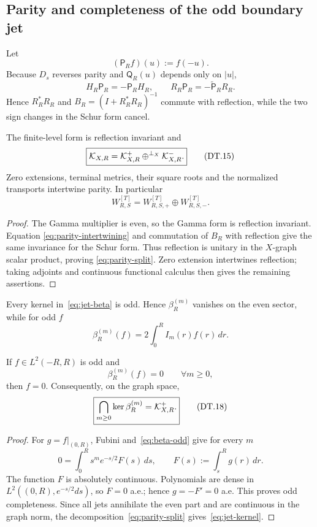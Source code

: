 \subsection{Parity and completeness of the odd boundary jet}

Let
\[
 (\mathsf P_Rf)(u):=f(-u).
\]
Because $D_s$ reverses parity and $\mathsf Q_R(u)$ depends only on $|u|$,
\[
 H_R\mathsf P_R=-\mathsf P_RH_R,
 \qquad
 R_R\mathsf P_R=-\widetilde{\mathsf P}_RR_R.
\tag{DT.14}\label{eq:parity-intertwining}
\]
Hence $R_R^*R_R$ and $B_R=(I+R_R^*R_R)^{-1}$ commute with reflection, while the two
sign changes in the Schur form cancel.

\begin{proposition}\label{prop:parity}
The finite-level form is reflection invariant and
\[
 \boxed{
 \mathcal K_{X,R}=\mathcal K_{X,R}^{+}\oplus^{\perp_X}\mathcal K_{X,R}^{-}.
 }
\tag{DT.15}\label{eq:parity-split}
\]
Zero extensions, terminal metrics, their square roots and the normalized transports
intertwine parity.  In particular
\[
 W_{R,S}^{[T]}=W_{R,S,+}^{[T]}\oplus W_{R,S,-}^{[T]}.
\tag{DT.16}\label{eq:W-parity-split}
\]
\end{proposition}

\begin{proof}
The Gamma multiplier is even, so the Gamma form is reflection invariant.  Equation
\eqref{eq:parity-intertwining} and commutation of $B_R$ with reflection give the same invariance for the
Schur form.  Thus reflection is unitary in the $X$-graph scalar product, proving
\eqref{eq:parity-split}.  Zero extension intertwines reflection; taking adjoints and continuous
functional calculus then gives the remaining assertions.
\end{proof}

Every kernel in~\eqref{eq:jet-beta} is odd.  Hence $\beta_R^{(m)}$ vanishes on the even sector,
while for odd $f$
\[
 \beta_R^{(m)}(f)=2\int_0^R I_m(r)f(r)\,dr.
\tag{DT.17}\label{eq:beta-odd}
\]

\begin{theorem}\label{thm:jet-complete}
If $f\in L^2(-R,R)$ is odd and
\[
 \beta_R^{(m)}(f)=0\qquad\forall m\ge0,
\]
then $f=0$.  Consequently, on the graph space,
\[
 \boxed{
 \bigcap_{m\ge0}\ker\beta_R^{(m)}=\mathcal K_{X,R}^{+}.
 }
\tag{DT.18}\label{eq:jet-kernel}
\]
\end{theorem}

\begin{proof}
For $g=f|_{(0,R)}$, Fubini and~\eqref{eq:beta-odd} give for every $m$
\[
 0=\int_0^R s^m e^{-s/2}F(s)\,ds,
 \qquad
 F(s):=\int_s^R g(r)\,dr.
\]
The function $F$ is absolutely continuous.  Polynomials are dense in
$L^2((0,R),e^{-s/2}ds)$, so $F=0$ a.e.; hence $g=-F'=0$ a.e.  This proves odd
completeness.  Since all jets annihilate the even part and are continuous in the graph
norm, the decomposition~\eqref{eq:parity-split} gives~\eqref{eq:jet-kernel}.
\end{proof}

